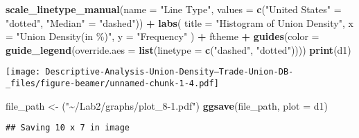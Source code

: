 \documentclass[
  ignorenonframetext,
]{beamer}
\newenvironment{Shaded}{\begin{snugshade}}{\end{snugshade}}
\newcommand{\AttributeTok}[1]{\textcolor[rgb]{0.13,0.29,0.53}{#1}}
\newcommand{\FunctionTok}[1]{\textcolor[rgb]{0.13,0.29,0.53}{\textbf{#1}}}
\newcommand{\NormalTok}[1]{#1}
\newcommand{\OtherTok}[1]{\textcolor[rgb]{0.56,0.35,0.01}{#1}}
\newcommand{\SpecialCharTok}[1]{\textcolor[rgb]{0.81,0.36,0.00}{\textbf{#1}}}
\newcommand{\StringTok}[1]{\textcolor[rgb]{0.31,0.60,0.02}{#1}}
\begin{document}
\begin{frame}[fragile]
\begin{Shaded}
\begin{Highlighting}[]
  \FunctionTok{scale\_linetype\_manual}\NormalTok{(}\AttributeTok{name =} \StringTok{"Line Type"}\NormalTok{, }\AttributeTok{values =} \FunctionTok{c}\NormalTok{(}\StringTok{"United States"} \OtherTok{=} \StringTok{"dotted"}\NormalTok{, }\StringTok{"Median"} \OtherTok{=} \StringTok{"dashed"}\NormalTok{)) }\SpecialCharTok{+}
  \FunctionTok{labs}\NormalTok{(}
    \AttributeTok{title =} \StringTok{"Histogram of Union Density"}\NormalTok{,}
    \AttributeTok{x =} \StringTok{"Union Density(in \%)"}\NormalTok{,}
    \AttributeTok{y =} \StringTok{"Frequency"}
\NormalTok{  ) }\SpecialCharTok{+}
\NormalTok{  ftheme }\SpecialCharTok{+}
  \FunctionTok{guides}\NormalTok{(}\AttributeTok{color =} \FunctionTok{guide\_legend}\NormalTok{(}\AttributeTok{override.aes =} \FunctionTok{list}\NormalTok{(}\AttributeTok{linetype =} \FunctionTok{c}\NormalTok{(}\StringTok{"dashed"}\NormalTok{, }\StringTok{"dotted"}\NormalTok{))))}
\FunctionTok{print}\NormalTok{(d1)}
\end{Highlighting}
\end{Shaded}

\texttt{[image: Descriptive-Analysis-Union-Density--Trade-Union-DB-\_files/figure-beamer/unnamed-chunk-1-4.pdf]}

\begin{Shaded}
\begin{Highlighting}[]
\NormalTok{file\_path }\OtherTok{\textless{}{-}}\NormalTok{ (}\StringTok{"\textasciitilde{}/Lab2/graphs/plot\_8{-}1.pdf"}\NormalTok{)}
\FunctionTok{ggsave}\NormalTok{(file\_path, }\AttributeTok{plot =}\NormalTok{ d1)}
\end{Highlighting}
\end{Shaded}

\begin{verbatim}
## Saving 10 x 7 in image
\end{verbatim}


\end{frame}
\end{document}
